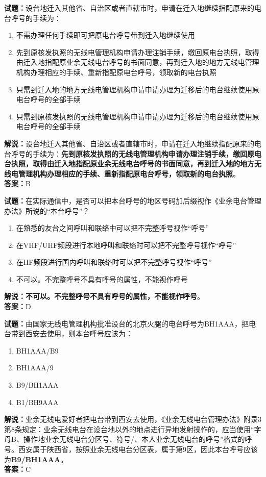 \documentclass{ctexbook}
\begin{document}
\noindent\textbf{试题：}设台地迁入其他省、自治区或者直辖市时，申请在迁入地继续指配原来的电台呼号的手续为：
\begin{enumerate}[leftmargin=3em]
\item 不需办理任何手续即可把原电台呼号带到迁入地继续使用
\item 先到原核发执照的无线电管理机构申请办理注销手续，缴回原电台执照，取得由迁入地指配原业余无线电台呼号的书面同意，再到迁入地的地方无线电管理机构办理相应的手续、重新指配原电台呼号，领取新的电台执照
\item 只需到迁入地的地方无线电管理机构申请申请办理为迁移后的电台继续使用原电台呼号的全部手续
\item 只需到原核发执照的无线电管理机构申请申请办理为迁移后的电台继续使用原电台呼号的全部手续
\end{enumerate}
\noindent\textbf{解说：}设台地迁入其他省、自治区或者直辖市时，申请在迁入地继续指配原来的电台呼号的手续为：\textbf{先到原核发执照的无线电管理机构申请办理注销手续，缴回原电台执照，取得由迁入地指配原业余无线电台呼号的书面同意，再到迁入地的地方无线电管理机构办理相应的手续、重新指配原电台呼号，领取新的电台执照}。\\\noindent\textbf{答案：}B

\bigskip




\noindent\textbf{试题：}在实际通信中，是否可以把本台呼号的地区号码加后缀视作《业余电台管理办法》所说的“本台呼号”？
\begin{enumerate}[leftmargin=3em]
\item 在熟悉的友台之间呼叫和联络中可以把不完整呼号视作“呼号”
\item 在VHF/UHF频段进行本地呼叫和联络时可以把不完整呼号视作“呼号”
\item 在HF频段进行国内呼叫和联络时可以把不完整呼号视作“呼号”
\item 不可以。不完整呼号不具有呼号的属性，不能视作呼号
\end{enumerate}
\textbf{解说：不可以。不完整呼号不具有呼号的属性，不能视作呼号}。\\\noindent\textbf{答案：}D

\bigskip




\noindent\textbf{试题：}由国家无线电管理机构批准设台的北京火腿的电台呼号为BH1AAA，把电台带到西安去使用，则本台呼号应该为：
\begin{enumerate}[leftmargin=3em]
\item BH1AAA/B9
\item BH1AAA/9
\item B9/BH1AAA
\item B1/BH9AAA
\end{enumerate}
\noindent\textbf{解说：}业余无线电爱好者把电台带到西安去使用，《业余无线电台管理办法》附录3第8条规定：业余无线电台在设台地以外的地点进行异地发射操作的，应当使用“字母B、操作地业余无线电台分区号、符号/、本人业余无线电台的呼号”格式的呼号。西安属于陕西省，按照业余无线电台分区表，属于第9区，因此本台呼号应该为\textbf{B9/BH1AAA}。\\\noindent\textbf{答案：}C
\end{document}
